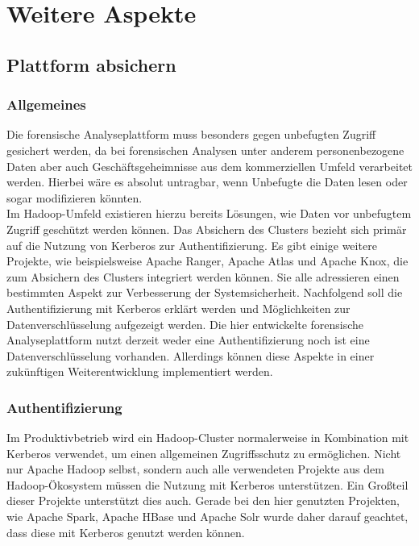 \chapter{Weitere Aspekte}
\label{ch:additional_aspects}

\section{Plattform absichern}
\label{sec:secure_platform}
\subsection{Allgemeines}
Die forensische Analyseplattform muss besonders gegen unbefugten Zugriff gesichert werden, da bei forensischen Analysen unter anderem personenbezogene Daten aber auch Geschäftsgeheimnisse aus dem kommerziellen Umfeld verarbeitet werden. Hierbei wäre es absolut untragbar, wenn Unbefugte die Daten lesen oder sogar modifizieren könnten.\\

\noindent
Im Hadoop-Umfeld existieren hierzu bereits Lösungen, wie Daten vor unbefugtem Zugriff geschützt werden können. Das Absichern des Clusters bezieht sich primär auf die Nutzung von Kerberos zur Authentifizierung. Es gibt einige weitere Projekte, wie beispielsweise Apache Ranger, Apache Atlas und Apache Knox, die zum Absichern des Clusters integriert werden können. Sie alle adressieren einen bestimmten Aspekt zur Verbesserung der Systemsicherheit. Nachfolgend soll die Authentifizierung mit Kerberos erklärt werden und Möglichkeiten zur Datenverschlüsselung aufgezeigt werden. Die hier entwickelte forensische Analyseplattform nutzt derzeit weder eine Authentifizierung noch ist eine Datenverschlüsselung vorhanden. Allerdings können diese Aspekte in einer zukünftigen Weiterentwicklung implementiert werden.

\subsection{Authentifizierung}

Im Produktivbetrieb wird ein Hadoop-Cluster normalerweise in Kombination mit Kerberos verwendet, um einen allgemeinen Zugriffsschutz zu ermöglichen.\cite{hadoop_security} Nicht nur Apache Hadoop selbst, sondern auch alle verwendeten Projekte aus dem Hadoop-Ökosystem müssen die Nutzung mit Kerberos unterstützen. Ein Großteil dieser Projekte unterstützt dies auch. Gerade bei den hier genutzten Projekten, wie Apache Spark, Apache HBase und Apache Solr wurde daher darauf geachtet, dass diese mit Kerberos genutzt werden können.\\


